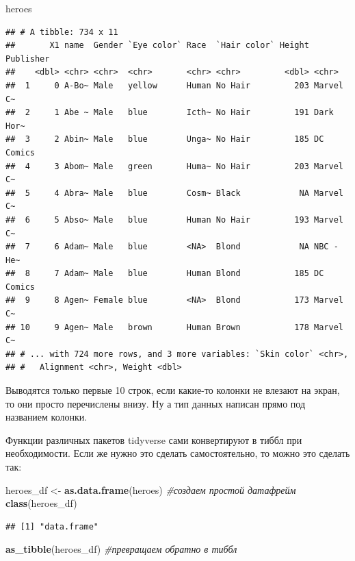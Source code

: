 \documentclass[
]{book}
\newenvironment{Shaded}{\begin{snugshade}}{\end{snugshade}}
\newcommand{\CommentTok}[1]{\textcolor[rgb]{0.56,0.35,0.01}{\textit{#1}}}
\newcommand{\KeywordTok}[1]{\textcolor[rgb]{0.13,0.29,0.53}{\textbf{#1}}}
\newcommand{\NormalTok}[1]{#1}
\newcommand{\StringTok}[1]{\textcolor[rgb]{0.31,0.60,0.02}{#1}}
\begin{document}
\begin{Shaded}
\begin{Highlighting}[]
\NormalTok{heroes}
\end{Highlighting}
\end{Shaded}

\begin{verbatim}
## # A tibble: 734 x 11
##       X1 name  Gender `Eye color` Race  `Hair color` Height Publisher
##    <dbl> <chr> <chr>  <chr>       <chr> <chr>         <dbl> <chr>    
##  1     0 A-Bo~ Male   yellow      Human No Hair         203 Marvel C~
##  2     1 Abe ~ Male   blue        Icth~ No Hair         191 Dark Hor~
##  3     2 Abin~ Male   blue        Unga~ No Hair         185 DC Comics
##  4     3 Abom~ Male   green       Huma~ No Hair         203 Marvel C~
##  5     4 Abra~ Male   blue        Cosm~ Black            NA Marvel C~
##  6     5 Abso~ Male   blue        Human No Hair         193 Marvel C~
##  7     6 Adam~ Male   blue        <NA>  Blond            NA NBC - He~
##  8     7 Adam~ Male   blue        Human Blond           185 DC Comics
##  9     8 Agen~ Female blue        <NA>  Blond           173 Marvel C~
## 10     9 Agen~ Male   brown       Human Brown           178 Marvel C~
## # ... with 724 more rows, and 3 more variables: `Skin color` <chr>,
## #   Alignment <chr>, Weight <dbl>
\end{verbatim}

Выводятся только первые 10 строк, если какие-то колонки не влезают на экран, то они просто перечислены внизу. Ну а тип данных написан прямо под названием колонки.

Функции различных пакетов tidyverse сами конвертируют в тиббл при необходимости. Если же нужно это сделать самостоятельно, то можно это сделать так:

\begin{Shaded}
\begin{Highlighting}[]
\NormalTok{heroes_df <-}\StringTok{ }\KeywordTok{as.data.frame}\NormalTok{(heroes) }\CommentTok{#создаем простой датафрейм}
\KeywordTok{class}\NormalTok{(heroes_df)}
\end{Highlighting}
\end{Shaded}

\begin{verbatim}
## [1] "data.frame"
\end{verbatim}

\begin{Shaded}
\begin{Highlighting}[]
\KeywordTok{as_tibble}\NormalTok{(heroes_df) }\CommentTok{#превращаем обратно в тиббл}
\end{Highlighting}
\end{Shaded}
\end{document}
